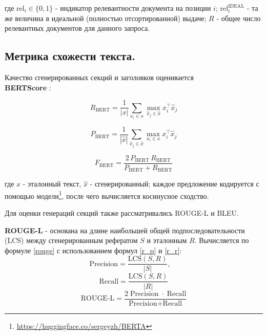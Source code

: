 \documentclass{article}
\begin{document}
где \(\mathrm{rel}_i\in\{0,1\}\) - индикатор релевантности документа на позиции \(i\); \(\mathrm{rel}^{\mathrm{IDEAL}}_i\) - та же величина в идеальной (полностью отсортированной) выдаче;  
\(R\) - общее число релевантных документов для данного запроса.  

\subsection*{Метрика схожести текста.} 
Качество сгенерированных секций и заголовков оценивается \\\textbf{BERTScore} \cite{bertscore}:

\begin{equation}\label{recall}
R_{\mathrm{BERT}}= \frac{1}{|x|}\sum_{x_i\in x}\max_{\hat{x}_j\in\hat{x}} x_i^\top \hat{x}_j
\end{equation}

\begin{equation}\label{precision}
P_{\mathrm{BERT}}= \frac{1}{|\hat{x}|}\sum_{\hat{x}_j\in\hat{x}}\max_{x_i\in x} x_i^\top \hat{x}_j
\end{equation}

\begin{equation}\label{f}
F_{\mathrm{BERT}}= \frac{2\,P_{\mathrm{BERT}}\,R_{\mathrm{BERT}}}{P_{\mathrm{BERT}} + R_{\mathrm{BERT}}}
\end{equation}

где \(x\) - эталонный текст, \(\hat{x}\) - сгенерированный; каждое предложение кодируется с помощью модели\footnote{\url{https://huggingface.co/sergeyzh/BERTA}}, после чего вычисляется косинусное сходство.  

Для оценки генераций секций также рассматривались ROUGE-\allowbreak L и BLEU.

\textbf{ROUGE-L} \cite{rouge} - основана на длине наибольшей общей подпоследовательности (LCS) между сгенерированным рефератом $S$ и эталонным $R$.
Вычисляется по формуле \eqref{rouge} с использованием формул \eqref{r_p} и \eqref{r_r}:
\begin{equation}\label{r_p}
  \text{Precision} = \frac{\mathrm{LCS}(S,R)}{|S|},\quad
\end{equation}
\begin{equation}\label{r_r}
  \text{Recall} = \frac{\mathrm{LCS}(S,R)}{|R|}
\end{equation}
\begin{equation}\label{rouge}
  \text{ROUGE‑L} = \frac{2\;\text{Precision}\;\cdot\;\text{Recall}}{\text{Precision} + \text{Recall}}
\end{equation}
\end{document}
